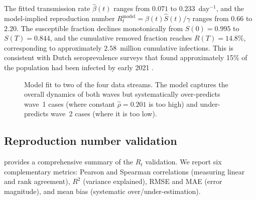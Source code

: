 \documentclass[11pt]{article}
\begin{document}
The fitted transmission rate $\hat{\beta}(t)$ ranges from $0.071$ to $0.233$~day$^{-1}$, and the model-implied reproduction number $R_t^{\mathrm{model}}=\hat{\beta}(t)\hat{S}(t)/\gamma$ ranges from $0.66$ to $2.20$. The susceptible fraction declines monotonically from $S(0)=0.995$ to $S(T)=0.844$, and the cumulative removed fraction reaches $R(T)=14.8\%$, corresponding to approximately $2.58$~million cumulative infections. This is consistent with Dutch seroprevalence surveys that found approximately 15\% of the population had been infected by early 2021 \citep{Vos2021}.

\begin{figure}[ht]
\centering
{}
\caption{Model fit to two of the four data streams. The model captures the overall dynamics of both waves but systematically over-predicts wave~1 cases (where constant $\hat\rho=0.201$ is too high) and under-predicts wave~2 cases (where it is too low).}\label{fig:main-fit}
\end{figure}

\subsection{Reproduction number validation}\label{sec:results:validation}

 provides a comprehensive summary of the $R_t$ validation. We report six complementary metrics: Pearson and Spearman correlations (measuring linear and rank agreement), $R^2$ (variance explained), RMSE and MAE (error magnitude), and mean bias (systematic over/under-estimation).
\end{document}
